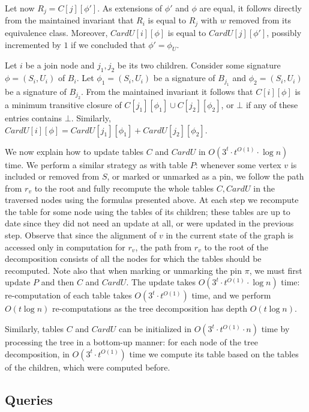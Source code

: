 \documentclass[a4paper,11pt]{article}
\theoremstyle{definition}
\theoremstyle{remark}
\newcommand{\pin}{\pi}
\begin{document}
Let now $R_j=C[j][\phi']$.  As extensions of $\phi'$ and $\phi$ are equal, it
follows directly from the maintained invariant that $R_i$ is equal to
$R_j$ with $w$ removed from its equivalence class.  Moreover,
$CardU[i][\phi]$ is equal to $CardU[j][\phi']$, possibly incremented
by $1$ if we concluded that $\phi'=\phi_U$.

\vskip 0.3cm

 Let $i$ be a join node and
$j_1,j_2$ be its two children.  Consider some signature
$\phi=(S_i,U_i)$ of $B_i$.  Let $\phi_1=(S_i,U_i)$ be a signature of
$B_{j_1}$ and $\phi_2=(S_i,U_i)$ be a signature of $B_{j_2}$.  From
the maintained invariant it follows that $C[i][\phi]$ is a minimum
transitive closure of $C[j_1][\phi_1]\cup C[j_2][\phi_2]$, or $\bot$
if any of these entries contains $\bot$.  Similarly,
$CardU[i][\phi]=CardU[j_1][\phi_1]+CardU[j_2][\phi_2]$.

\vskip 0.3cm

We now explain how to update tables $C$ and $CardU$ in $O(3^t\cdot
t^{O(1)}\cdot \log n)$ time.  We perform a similar strategy as with
table $P$: whenever some vertex $v$ is included or
removed from $S$, or marked or unmarked as a pin, we follow the path
from $r_v$ to the root and fully recompute the whole tables $C,CardU$
in the traversed nodes using the formulas presented above.  At each
step we recompute the table for some node using the tables of its
children; these tables are up to date since they did not need an
update at all, or were updated in the previous step.  Observe that
since the alignment of $v$ in the current state of the graph is
accessed only in computation for $r_v$, the path from $r_v$ to the
root of the decomposition consists of all the nodes for which the
tables should be recomputed.  Note also that when marking or unmarking
the pin $\pin$, we must first update $P$ and then $C$ and $CardU$.
The update takes $O(3^t\cdot t^{O(1)}\cdot \log n)$ time:
re-computation of each table takes $O(3^t\cdot t^{O(1)})$ time, and we
perform $O(t\log n)$ re-computations as the tree decomposition has
depth $O(t\log n)$.

Similarly, tables $C$ and $CardU$ can be initialized in $O(3^t\cdot
t^{O(1)}\cdot n)$ time by processing the tree in a bottom-up manner:
for each node of the tree decomposition, in $O(3^t\cdot t^{O(1)})$
time we compute its table based on the tables of the children, which
were computed before.

\subsection{Queries}
\end{document}
